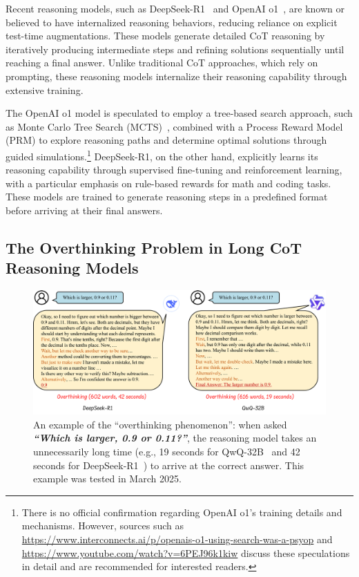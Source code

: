 Recent reasoning models, such as DeepSeek-R1~\cite{guo2025deepseek} and OpenAI o1~\cite{luo2025o1}, are known or believed to have internalized reasoning behaviors, reducing reliance on explicit test-time augmentations. These models generate detailed CoT reasoning by iteratively producing intermediate steps and refining solutions sequentially until reaching a final answer. Unlike traditional CoT approaches, which rely on prompting, these reasoning models internalize their reasoning capability through extensive training.

The OpenAI o1 model is speculated to employ a tree-based search approach, such as Monte Carlo Tree Search (MCTS)~\cite{kocsis2006bandit, coulom2006efficient}, combined with a Process Reward Model (PRM) to explore reasoning paths and determine optimal solutions through guided simulations.\footnote{There is no official confirmation regarding OpenAI o1’s training details and mechanisms. However, sources such as \url{https://www.interconnects.ai/p/openais-o1-using-search-was-a-psyop} and \url{https://www.youtube.com/watch?v=6PEJ96k1kiw} discuss these speculations in detail and are recommended for interested readers.} DeepSeek-R1, on the other hand, explicitly learns its reasoning capability through supervised fine-tuning and reinforcement learning, with a particular emphasis on rule-based rewards for math and coding tasks. These models are trained to generate reasoning steps in a predefined format before arriving at their final answers.

\subsection{The Overthinking Problem in Long CoT Reasoning Models}

\begin{figure}[t]
    \centering
    \includegraphics[width=0.99\linewidth]{figs/overthinking.pdf}
    \caption{An example of the ``overthinking phenomenon'': when asked \textbf{\textit{``Which is larger, 0.9 or 0.11?''}}, the reasoning model takes an unnecessarily long time (e.g., 19 seconds for QwQ-32B~\cite{qwen_qwq_32b_preview} and 42 seconds for DeepSeek-R1~\cite{guo2025deepseek}) to arrive at the correct answer. This example was tested in March 2025.}
    \label{fig:overthink-generation}
\end{figure}

